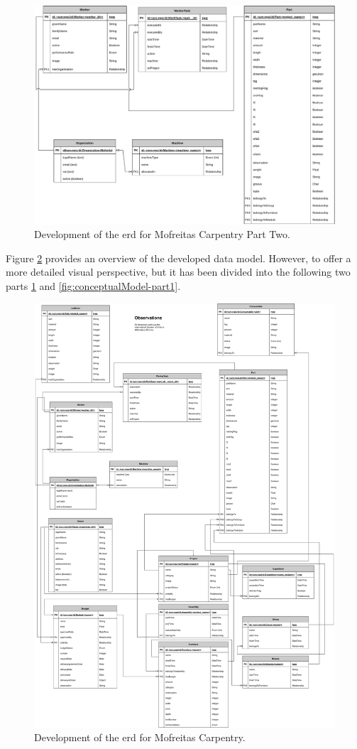 \begin{figure}[!ht]
    \centering
    \includegraphics[width=.65\linewidth]{images/Development/chap3/WoodWork- Part 1.pdf}
    \caption{Development of the \acrfull{erd} for Mofreitas Carpentry Part Two.}
    \label{fig:conceptualModel-part2}
\end{figure}

Figure \ref{fig:conceptualModel} provides an overview of the developed data model. However, to offer a more detailed visual perspective, but it has been divided into the following two parts \ref{fig:conceptualModel-part2} and \ref{fig:conceptualModel-part1}.

\begin{figure}[H]
    \centering
    \includegraphics[width=.82\linewidth]{images/Development/chap3/WoodWork.drawio.pdf}
    \caption{Development of the \acrfull{erd} for Mofreitas Carpentry.}
    \label{fig:conceptualModel}
\end{figure}


